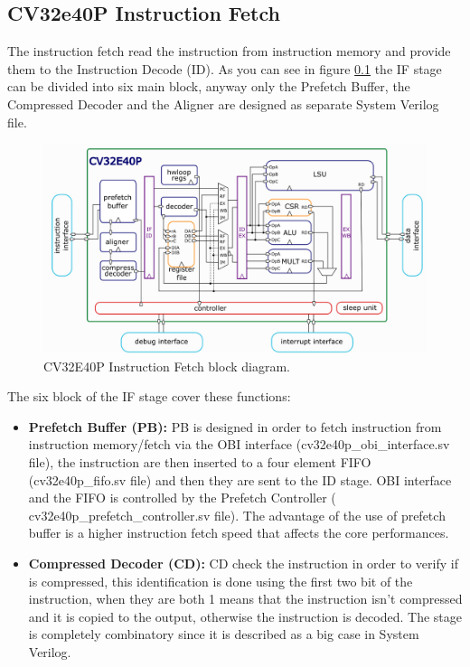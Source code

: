 {{		\subsection{CV32e40P Instruction Fetch}{
		    The instruction fetch read the instruction from instruction memory and provide them to the Instruction Decode (ID).
		    As you can see in figure \ref{} the IF stage can be divided into six main block, anyway only  the Prefetch Buffer, the Compressed Decoder and the Aligner are designed as separate System Verilog file.
		    
		    \begin{figure}[H]
        		\centering
        		\includegraphics[scale=0.4,center]{./images/CV32E40P_core_diagram.png}
        		\caption{CV32E40P Instruction Fetch block diagram.}
        		\label{fig:cv32e40p_block_diagram}
        	\end{figure} 
        	
        	The six block of the IF stage cover these functions:
        	\begin{itemize}
        	    \item \textbf{Prefetch Buffer (PB):} PB is designed in order to fetch instruction from instruction memory/fetch via the OBI interface (cv32e40p\_obi\_interface.sv file), the instruction are then inserted to a four element FIFO (cv32e40p\_fifo.sv file) and then they are sent to the ID stage. OBI interface and the FIFO is controlled by the Prefetch Controller ( cv32e40p\_prefetch\_controller.sv file). 
        	    The advantage of the use of prefetch buffer is a higher instruction fetch speed that affects the core performances.
        	   
        	    \item \textbf{Compressed Decoder (CD):} CD check the instruction in order to verify if is compressed, this identification is done using the first two bit of the instruction, when they are both 1 means that the instruction isn't compressed and it is copied to the output, otherwise the instruction is decoded. 
        	    The stage is completely combinatory since it is described as a big case in System Verilog.
        	    

\end{itemize}}}}
